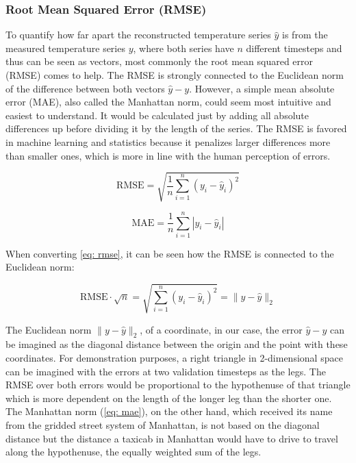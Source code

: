 \subsubsection*{Root Mean Squared Error (RMSE)}

To quantify how far apart the reconstructed temperature series $\hat{y}$ is from the measured temperature series $y$, where both series have $n$ different timesteps and thus can be seen as vectors, most commonly the root mean squared error (RMSE) comes to help.
The RMSE is strongly connected to the Euclidean norm of the difference between both vectors $\hat{y} - y$.
However, a simple mean absolute error (MAE), also called the Manhattan norm, could seem most intuitive and easiest to understand.
It would be calculated just by adding all absolute differences up before dividing it by the length of the series.
The RMSE is favored in machine learning and statistics because it penalizes larger differences more than smaller ones, which is more in line with the human perception of errors. 

\begin{equation}
    \text{RMSE} = \sqrt{\frac{1}{n} \sum_{i=1}^{n} (y_i - \hat{y}_i)^2}
    \label{eq: rmse}
\end{equation}

\begin{equation}
    \text{MAE} = \frac{1}{n} \sum_{i=1}^{n} |y_i - \hat{y}_i|
    \label{eq: mae}
\end{equation}

When converting \autoref*{eq: rmse}, it can be seen how the RMSE is connected to the Euclidean norm:

\begin{equation}
  \text{RMSE} \cdot \sqrt{n} = \sqrt{\sum_{i=1}^{n} (y_i - \hat{y}_i)^2} = \| y - \hat{y} \|_2  
  \label{eq: rmse_euclid}
\end{equation}

The Euclidean norm $\| y - \hat{y} \|_2$, of a coordinate, in our case, the error $\hat{y} - y$ can be imagined as the diagonal distance between the origin and the point with these coordinates.
For demonstration purposes, a right triangle in 2-dimensional space can be imagined with the errors at two validation timesteps as the legs.
The RMSE over both errors would be proportional to the hypothenuse of that triangle which is more dependent on the length of the longer leg than the shorter one.
The Manhattan norm (\autoref{eq: mae}), on the other hand, which received its name from the gridded street system of Manhattan, is not based on the diagonal distance but the distance a taxicab in Manhattan would have to drive to travel along the hypothenuse, the equally weighted sum of the legs.

